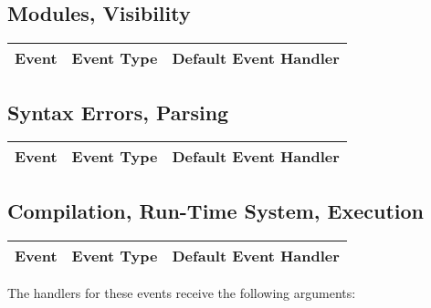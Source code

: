 \subsection{Modules, Visibility}
\begin{tabular}{|p{1.2cm}p{8cm}p{5cm}|}
\hline
{\bf Event} & {\bf Event Type} & {\bf Default Event Handler}\\
\hline

\hline
\end{tabular}
\vspace{0.5cm}

\subsection{Syntax Errors, Parsing}
\begin{tabular}{|p{1.2cm}p{8cm}p{4.5cm}|}
\hline
{\bf Event} & {\bf Event Type} & {\bf Default Event Handler}\\
\hline

\hline
\end{tabular}

\subsection{Compilation, Run-Time System, Execution}
\begin{tabular}{|p{1.2cm}p{8cm}p{4.5cm}|}
\hline
{\bf Event} & {\bf Event Type} & {\bf Default Event Handler}\\
\hline

\hline
\end{tabular}
\vspace{0.5cm}

\noindent
The handlers for these events receive the following arguments:

